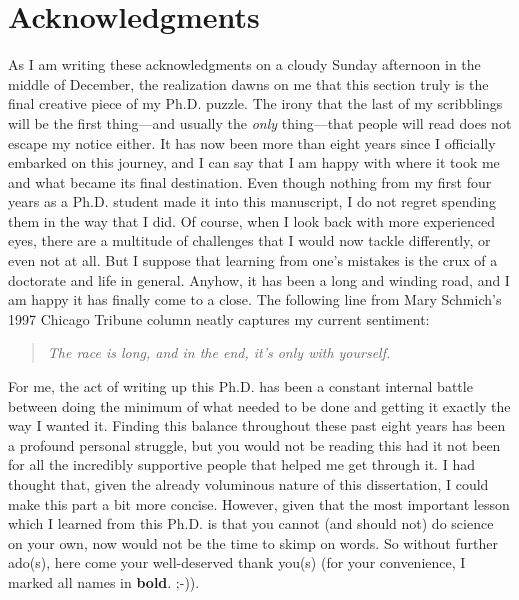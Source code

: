 \chapter*{Acknowledgments}
%
\label{ch:preface}
%

%
%

As I am writing these acknowledgments on a cloudy Sunday afternoon in the middle of December, the realization
dawns on me that this section truly is the final creative piece of my Ph.D. puzzle. The irony that the last of
my scribblings will be the first thing---and usually the \emph{only} thing---that people will read does not
escape my notice either. It has now been more than eight years since I officially embarked on this journey,
and I can say that I am happy with where it took me and what became its final destination. Even though
nothing from my first four years as a Ph.D. student made it into this manuscript, I do not regret spending
them in the way that I did. Of course, when I look back with more experienced eyes, there are a multitude of
challenges that I would now tackle differently, or even not at all. But I suppose that learning from one's
mistakes is the crux of a doctorate and life in general. Anyhow, it has been a long and winding road, and I am
happy it has finally come to a close. The following line from Mary Schmich's 1997 Chicago Tribune column
neatly captures my current sentiment:
%
\begin{quote}
\textit{The race is long, and in the end, it's only with yourself.}
\end{quote}
%
For me, the act of writing up this Ph.D. has been a constant internal battle between doing the minimum of what
needed to be done and getting it exactly the way I wanted it. Finding this balance throughout these past eight
years has been a profound personal struggle, but you would not be reading this had it not been for all the
incredibly supportive people that helped me get through it. I had thought that, given the already voluminous
nature of this dissertation, I could make this part a bit more concise. However, given that the most important
lesson which I learned from this Ph.D. is that you cannot (and should not) do science on your own, now would
not be the time to skimp on words. So without further ado(s), here come your well-deserved thank you(s) (for your
convenience, I marked all names in \textbf{bold}. ;-)).

